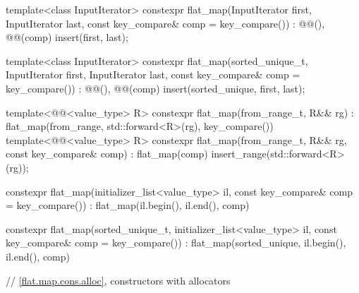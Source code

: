 \begin{codeblock}
{{    template<class InputIterator>
      constexpr flat_map(InputIterator first, InputIterator last,
                         const key_compare& comp = key_compare())
        : @@(), @@(comp) { insert(first, last); }

    template<class InputIterator>
      constexpr flat_map(sorted_unique_t, InputIterator first, InputIterator last,
                         const key_compare& comp = key_compare())
        : @@(), @@(comp) { insert(sorted_unique, first, last); }

    template<@@<value_type> R>
      constexpr flat_map(from_range_t, R&& rg)
        : flat_map(from_range, std::forward<R>(rg), key_compare()) { }
    template<@@<value_type> R>
      constexpr flat_map(from_range_t, R&& rg, const key_compare& comp)
        : flat_map(comp) { insert_range(std::forward<R>(rg)); }

    constexpr flat_map(initializer_list<value_type> il, const key_compare& comp = key_compare())
      : flat_map(il.begin(), il.end(), comp) { }

    constexpr flat_map(sorted_unique_t, initializer_list<value_type> il,
                       const key_compare& comp = key_compare())
      : flat_map(sorted_unique, il.begin(), il.end(), comp) { }

    // \ref{flat.map.cons.alloc}, constructors with allocators

}}
\end{codeblock}
